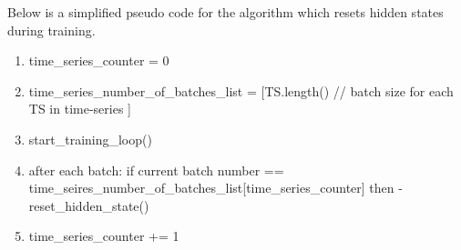 Below is a simplified pseudo code for the algorithm which resets hidden states
during training.
\begin{enumerate}
  \item time\_series\_counter = 0
  \item time\_series\_number\_of\_batches\_list = [TS.length() // batch size for each TS in time-series ]
  \item start\_training\_loop()
  \item after each batch: if current batch number ==
        time\_seires\_number\_of\_batches\_list[time\_series\_counter]
        then -\> reset\_hidden\_state()
  \item time\_series\_counter += 1
\end{enumerate}







